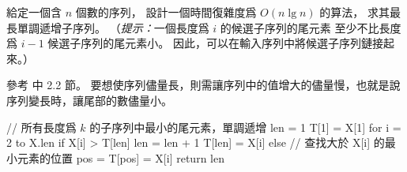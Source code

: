 \startEXERCISE\DIFFICULT
給定一個含 $n$ 個數的序列，
設計一個時間復雜度爲 $O(n\lg n)$ 的算法，
求其最長單調遞增子序列。
（\emph{提示：}一個長度爲 $i$ 的候選子序列的尾元素
至少不比長度爲 $i-1$ 候選子序列的尾元素小。
因此，可以在輸入序列中將候選子序列鏈接起來。）
\stopEXERCISE

\startANSWER
參考  中 2.2 節。
要想使序列儘量長，則需讓序列中的值增大的儘量慢，也就是說序列變長時，讓尾部的數儘量小。

\startCLRSCODE
// 所有長度爲 $k$ 的子序列中最小的尾元素，單調遞增
len = 1
T[1] = X[1]
for i = 2 to X.len
	if X[i] > T[len]
		len = len + 1
		T[len] = X[i]
	else
		// 查找大於 X[i] 的最小元素的位置
		pos = 
		T[pos] = X[i]
return len
\stopCLRSCODE
\stopANSWER
